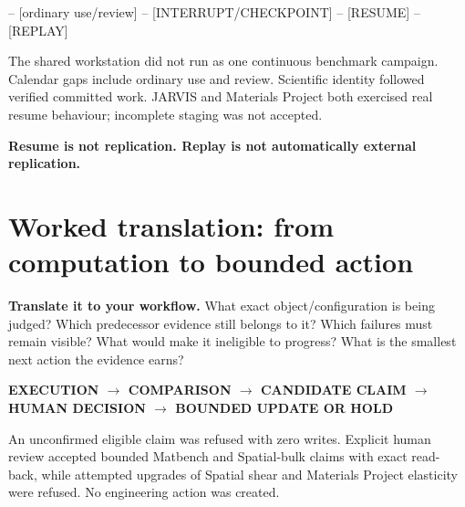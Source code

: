 \documentclass[11pt,a4paper]{article}
\begin{document}
\begin{center}\small\ttfamily
[RUN] -- [ordinary use/review] -- [INTERRUPT/CHECKPOINT] -- [RESUME] -- [REPLAY]
\end{center}

The shared workstation did not run as one continuous benchmark campaign. Calendar gaps include ordinary use and review. Scientific identity followed verified committed work. JARVIS and Materials Project both exercised real resume behaviour; incomplete staging was not accepted.

\begin{center}\bfseries Resume is not replication. Replay is not automatically external replication.\end{center}
\newpage

\section*{Worked translation: from computation to bounded action}
\begin{center}
\end{center}

\textbf{Translate it to your workflow.} What exact object/configuration is being judged? Which predecessor evidence still belongs to it? Which failures must remain visible? What would make it ineligible to progress? What is the smallest next action the evidence earns?

\begin{center}\small\bfseries
EXECUTION $\rightarrow$ COMPARISON $\rightarrow$ CANDIDATE CLAIM $\rightarrow$ HUMAN DECISION $\rightarrow$ BOUNDED UPDATE OR HOLD
\end{center}
An unconfirmed eligible claim was refused with zero writes. Explicit human review accepted bounded Matbench and Spatial-bulk claims with exact read-back, while attempted upgrades of Spatial shear and Materials Project elasticity were refused. No engineering action was created.
\end{document}
